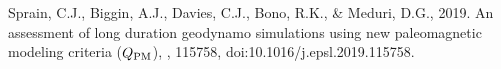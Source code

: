 \begin{thebibliography}{}
%
{\color{red}
Sprain, C.J., Biggin, A.J., Davies, C.J., Bono, R.K., \& Meduri, D.G., 2019. An assessment of long duration geodynamo simulations using new paleomagnetic modeling criteria ($Q_{\rm PM}$), , 115758, doi:10.1016/j.epsl.2019.115758.
}
%
%

\end{thebibliography}
